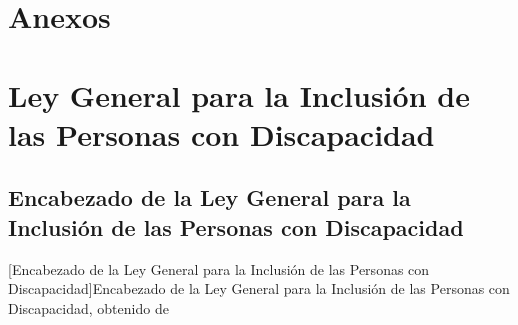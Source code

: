 


\chapter*{Anexos}

\chapter{Ley General para la Inclusión de las Personas con Discapacidad}
\label{anexo:ley_inclusion_disc}
\section{Encabezado de la Ley General para la Inclusión de las Personas con Discapacidad}

\begin{center}
    [Encabezado de la Ley General para la Inclusión de las Personas con Discapacidad]{Encabezado de la Ley General para la Inclusión de las Personas con Discapacidad, obtenido de \cite{ref34}}
\end{center}

